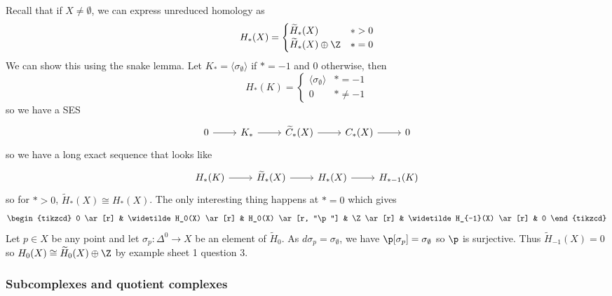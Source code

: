 \documentclass[a4paper]{article}
\renewcommand{\b}{\p}
\begin{document}
\begin{eg}
  Recall that if \(X \neq \emptyset\), we can express unreduced homology as
  \[
    H_*(X) =
    \begin{cases}
      \widetilde H_*(X) & * > 0 \\
      \widetilde H_*(X) \oplus \Z & * = 0
    \end{cases}
  \]
  We can show this using the snake lemma. Let \(K_* = \langle \sigma_\emptyset \rangle\) if \(* = -1\) and \(0\) otherwise, then
  \[
    H_*(K) =
    \begin{cases}
      \langle \sigma_\emptyset \rangle & * = -1 \\
      0 & * \neq -1
    \end{cases}
  \]
  so we have a SES
  \[
    \begin{tikzcd}
      0 \ar[r] & K_* \ar[r] & \widetilde C_*(X) \ar[r] & C_*(X) \ar[r] & 0
    \end{tikzcd}
  \]
  so we have a long exact sequence that looks like
  \[
    \begin{tikzcd}
      H_*(K) \ar[r] & \widetilde H_*(X) \ar[r] & H_*(X) \ar[r] & H_{* - 1}(K)
    \end{tikzcd}
  \]
  so for \(* > 0\), \(\tilde H_*(X) \cong H_*(X)\). The only interesting thing happens at \(* = 0\) which gives
  \[
    \begin{tikzcd}
      0 \ar[r] & \widetilde H_0(X) \ar[r] & H_0(X) \ar[r, "\b"] & \Z \ar[r] & \widetilde H_{-1}(X) \ar[r] & 0
    \end{tikzcd}
  \]
  Let \(p \in X\) be any point and let \(\sigma_p: \Delta^0 \to X\) be an element of \(\widetilde H_0\). As \(d \sigma_p = \sigma_\emptyset\), we have \(\b[\sigma_p] = \sigma_\emptyset\) so \(\b\) is surjective. Thus \(\widetilde H_{-1}(X) = 0\) so \(H_0(X) \cong \widetilde H_0(X) \oplus \Z\) by example sheet 1 question 3.
\end{eg}

\subsubsection{Subcomplexes and quotient complexes}
\end{document}
